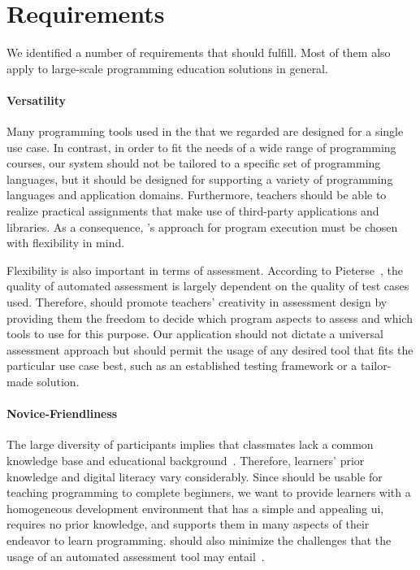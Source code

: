 \section{Requirements}\label{section:requirements}

We identified a number of requirements that \tool should fulfill. Most of them also apply to large-scale programming education solutions in general.

\paragraph{Versatility}

Many programming tools used in the \moocs that we regarded are designed for a single use case. In contrast, in order to fit the needs of a wide range of programming courses, our system should not be tailored to a specific set of programming languages, but it should be designed for supporting a variety of programming languages and application domains. Furthermore, teachers should be able to realize practical assignments that make use of third-party applications and libraries. As a consequence, \tool's approach for program execution must be chosen with flexibility in mind.

Flexibility is also important in terms of assessment. According to Pieterse~\cite{pieterse2013automated}, the quality of automated assessment is largely dependent on the quality of test cases used. Therefore, \tool should promote teachers' creativity in assessment design by providing them the freedom to decide which program aspects to assess and which tools to use for this purpose. Our application should not dictate a universal assessment approach but should permit the usage of any desired tool that fits the particular use case best, such as an established testing framework or a tailor-made solution.

\paragraph{Novice-Friendliness}

The large diversity of \mooc participants implies that classmates lack a common knowledge base and educational background~\cite{pappano2012year}. Therefore, learners' prior knowledge and digital literacy vary considerably. Since \tool should be usable for teaching programming to complete beginners, we want to provide learners with a homogeneous development environment that has a simple and appealing \gls{ui}, requires no prior knowledge, and supports them in many aspects of their endeavor to learn programming. \tool should also minimize the challenges that the usage of an automated assessment tool may entail~\cite{pieterse2013automated}.

